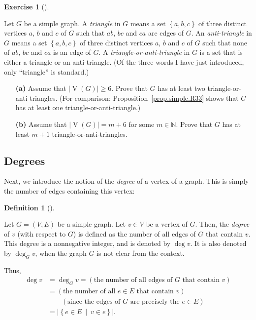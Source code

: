 \documentclass[numbers=enddot,12pt,final,onecolumn,notitlepage]{scrartcl}%
\theoremstyle{definition}
\newtheorem{defi}[theo]{Definition}
\newenvironment{definition}[1][]
{\begin{defi}[#1]\begin{leftbar}}
{\end{leftbar}\end{defi}}
\newtheorem{exmp}[theo]{Exercise}
\newenvironment{exercise}[1][]
{\begin{exmp}[#1]\begin{leftbar}}
{\end{leftbar}\end{exmp}}
\newcommand{\NN}{\mathbb{N}}
\newcommand{\set}[1]{\left\{ #1 \right\}}
\newcommand{\abs}[1]{\left| #1 \right|}
\newcommand{\tup}[1]{\left( #1 \right)}
\newcommand{\verts}[1]{\operatorname{V}\left( #1 \right)}
\begin{document}
\begin{exercise} \label{exa.simple.R33.two}
Let $G$ be a simple graph. A \textit{triangle} in $G$ means a set
$\set{a, b, c}$ of three distinct vertices $a$, $b$ and $c$ of $G$
such that $ab$, $bc$ and $ca$ are edges of $G$. An
\textit{anti-triangle} in $G$ means a set $\set{a, b, c}$ of three
distinct vertices $a$, $b$ and $c$ of $G$ such that none of $ab$, $bc$
and $ca$ is an edge of $G$. A \textit{triangle-or-anti-triangle} in
$G$ is a set that is either a triangle or an anti-triangle.
(Of the three words I have just introduced, only ``triangle'' is
standard.)

\begin{enumerate}

\item[\textbf{(a)}] Assume that $\abs{\verts{G}}\geq 6$.
Prove that $G$ has at least two
triangle-or-anti-triangles. (For comparison:
Proposition~\ref{prop.simple.R33} shows that $G$ has at least one
triangle-or-anti-triangle.)

\item[\textbf{(b)}] Assume that $\abs{\verts{G}} = m+6$ for some
$m \in \NN$. Prove that $G$ has at least $m+1$
triangle-or-anti-triangles.

\end{enumerate}

\end{exercise}

\subsection{\label{sect.intro.deg}Degrees}

Next, we introduce the notion of the \textit{degree} of a vertex of a
graph. This is simply the number of edges containing this vertex:

\begin{definition} \label{def.intro.deg}
Let $G = \tup{V, E}$ be a simple graph. Let $v \in V$ be a vertex of
$G$. Then, the \textit{degree} of $v$ (with respect to $G$) is defined
as the number of all edges of $G$ that contain $v$.
This degree is a nonnegative integer, and is denoted by $\deg v$. It
is also denoted by $\deg_G v$, when the graph $G$ is not clear from
the context.

Thus,
\begin{align}
\deg v &= \deg_G v =
\left(\text{the number of all edges of } G \text{ that contain } v
\right)
\label{eq.def.intro.deg.0a} \\
&=
\left(\text{the number of all } e \in E \text{ that contain } v
\right)
\label{eq.def.intro.deg.0b} \\
& \qquad
\left(\text{since the edges of } G \text{ are precisely the } e \in E
\right) \nonumber \\
&= \abs{\set{e \in E \ \mid \ v \in e }} .
\label{eq.def.intro.deg.0c}
\end{align}
\end{definition}
\end{document}
